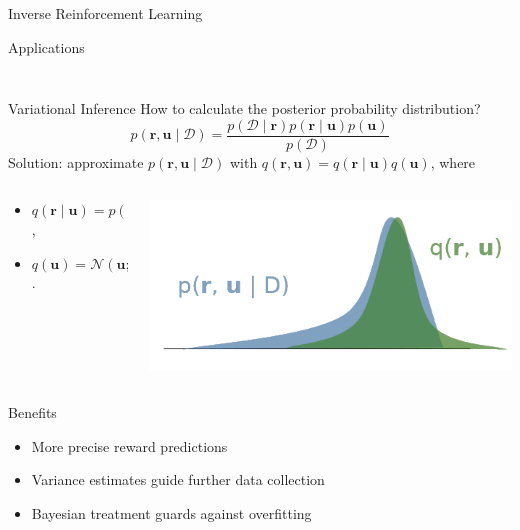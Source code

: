 \documentclass[handout,8pt]{beamer}
\begin{document}
\begin{frame}{Inverse Reinforcement Learning}
\begin{block}{Applications}
\begin{columns}[T]
\begin{column}{0.5\textwidth}
\begin{figure}
        \end{figure}
      \end{column}
    \end{columns}
  \end{block}
\end{frame}

\begin{frame}{Variational Inference}
  How to calculate the posterior probability distribution?
  \[
    p(\mathbf{r}, \mathbf{u} \mid \mathcal{D}) = \frac{p(\mathcal{D} \mid
      \mathbf{r})p(\mathbf{r} \mid \mathbf{u})p(\mathbf{u})}{p(\mathcal{D})}
  \]
  Solution: approximate $p(\mathbf{r}, \mathbf{u} \mid \mathcal{D})$ with
  $q(\mathbf{r}, \mathbf{u}) = q(\mathbf{r} \mid \mathbf{u})q(\mathbf{u})$, where
  \begin{columns}[onlytextwidth,T]
    \begin{column}{0.4\textwidth}
      \begin{itemize}
      \item $q(\mathbf{r} \mid \mathbf{u}) = p(\mathbf{r} \mid \mathbf{u})$,
      \item $q(\mathbf{u}) = \mathcal{N}(\mathbf{u}; \bm\mu, \bm\Sigma)$.
      \end{itemize}
    \end{column}
    \begin{column}{0.6\textwidth}
      \includegraphics[scale=1]{vi.png}
    \end{column}
  \end{columns}
  \begin{block}{Benefits}
    \begin{itemize}
    \item More precise reward predictions
    \item Variance estimates guide further data collection
    \item Bayesian treatment guards against overfitting
    \end{itemize}
  \end{block}
\end{frame}
\end{document}
